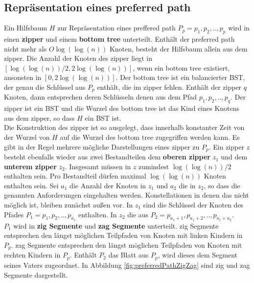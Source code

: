\documentclass[a4paper,12pt]{article}
\begin{document}
\subsection{Repräsentation eines preferred path}
Ein Hilfsbaum $H$ zur Repräsentation eines preffered path $P_p = p_1,p_2,..,p_p$ wird in einen \textbf{zipper} und einem \textbf{bottom tree} unterteilt. Enthält der preferred path nicht mehr als $O\log\left(\log\left(n\right)\right)$ Knoten, besteht der Hilfsbaum allein aus dem zipper. Die Anzahl der Knoten des zipper liegt in \\$\left[\log\left(\log\left(n\right)\right) / 2, 2 \log\left(\log\left(n\right)\right)  \right] $, wenn ein bottom tree existiert, ansonsten in $\left[0, 2 \log\left(\log\left(n\right)\right)  \right] $. Der bottom tree ist ein balancierter BST, der genau die Schlüssel aus $P_p$ enthält, die im zipper fehlen. Enthält der zipper $q$ Knoten, dann entsprechen deren Schlüsseln denen aus dem Pfad $p_1, p_2,..,p_q$. Der zipper ist ein BST und die Wurzel des bottom tree ist das Kind eines Knotens aus dem zipper, so dass $H$ ein BST ist. \\
 Die Konstruktion des zipper ist so ausgelegt, dass innerhalb konstanter Zeit von der Wurzel von $H$ auf die Wurzel des bottom tree zugegriffen werden kann. Es gibt in der Regel mehrere mögliche Darstellungen eines zipper zu $P_p$. Ein zipper $z$ besteht ebenfalls wieder aus zwei Bestandteilen dem \textbf{oberen zipper} $z_1$  und dem \textbf{unterem zipper} $z_2$. Insgesamt müssen in $z$ zumindest  $\log\left(\log\left(n\right)\right) / 2$ enthalten sein. Pro Bestandteil dürfen maximal $\log\left(\log\left(n\right)\right)$ Knoten enthalten sein. Sei $a_1$ die Anzahl der Knoten in $z_1$ und $a_2$ die in $z_2$, so dass die genannten Anforderungen eingehalten werden. Konstellationen in denen das nicht möglich ist, bleiben zunächst außen vor. In $z_1$ sind die Schlüssel der Knoten des Pfades $P_1 = p_1, p_2,.., p_{a_1}$ enthalten. In $z_2$ die aus $P_2 = p_{a_1 + 1}, p_{a_1 + 2},..,p_{a_1 + a_2} $. \\
 $P_1$ wird in \textbf{zig Segmente} und \textbf{zag Segmente} unterteilt. zig Segmente entsprechen den längst möglichen Teilpfaden von Knoten mit linken Kindern in $P_p$. zag Segmente entsprechen den längst möglichen Teilpfaden von Knoten mit rechten Kindern in $P_p$. Enthält $P_2$ das Blatt aus $P_p$, wird dieses dem Segment seines Vaters zugeordnet. In Abbildung  \ref{fig:preferredPathZigZag} sind zig und zag Segmente dargestellt.
\end{document}
